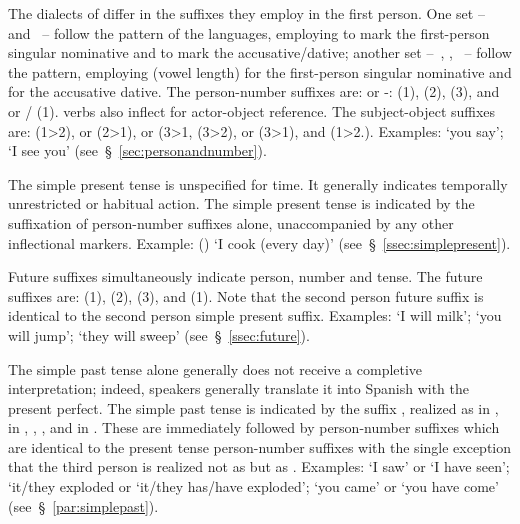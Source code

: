 The dialects of \SYQ{} differ in the suffixes they employ in the first person. One set --~\AMV{} and \LT~-- follow the pattern of the \QII{} languages, employing  to mark the first-person singular nominative and  to mark the accusative/dative; another set --~\ACH, \SP, \CH~-- follow the \QI{} pattern, employing \phono{-:} (vowel length) for the first-person singular nominative and  for the accusative dative. The person-number suffixes are:  or -: (1),  (2),  (3), and  or / \phono{-:} (1). \SYQ{} verbs also inflect for actor-object reference. The subject-object suffixes are:  (1>2),  or  (2>1),  or  (3>1,  (3>2),  or  (3>1), and  (1>2.). Examples:  ‘you say’;  ‘I see you’ (see~§~\ref{sec:personandnumber}).

The simple present tense is unspecified for time. It generally indicates temporally unrestricted or habitual action. The simple present tense is indicated by the suffixation of person-number suffixes alone, unaccompanied by any other inflectional markers. Example:  () ‘I cook (every day)’ (see~§~\ref{ssec:simplepresent}).

Future suffixes simultaneously indicate person, number and tense. The future suffixes are:  (1),  (2),  (3), and  (1). Note that the second person future suffix is identical to the second person simple present suffix. Examples:  ‘I will milk’;  ‘you will jump’;  ‘they will sweep’ (see~§~\ref{ssec:future}).

The simple past tense alone generally does not receive a completive interpretation; indeed, speakers generally translate it into Spanish with the present perfect. The simple past tense is indicated by the suffix , realized as  in \AMV,  in \ACH, \LT, \SP, and  in \CH. These are immediately followed by person-number suffixes which are identical to the present tense person-number suffixes with the single exception that the third person is realized not as  but as \phono{-\uo}. Examples:  ‘I saw’ or ‘I have seen’;  ‘it/they exploded or ‘it/they has/have exploded’;  ‘you came’ or ‘you have come’ (see~§~\ref{par:simplepast}).

